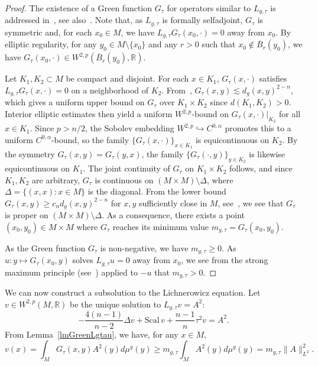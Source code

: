 \documentclass[a4paper, 10pt, reqno]{amsart}
\theoremstyle{plain}
\theoremstyle{remark}
\theoremstyle{definition}
\newcommand{\bR}{\mathbb{R}}
\newcommand{\Bbar}{\overline{B}}
\newcommand{\scal}{\mathrm{Scal}}
\begin{document}
\begin{proof}
    The existence of a Green function $G_\tau$ for operators similar to $L_{g,
                \tau}$ is addressed in~\cite{KimSakellaris}, see also~\cite{AvalosCogoAbrego}.
    Note that, as $L_{g, \tau}$ is formally selfadjoint, $G_\tau$ is symmetric and,
    for each $x_0 \in M$, we have $L_{g, \tau} G_\tau(x_0, \cdot) = 0$ away from
    $x_0$. By elliptic regularity, for any $y_0 \in M \setminus \{x_0\}$ and any $r
        > 0$ such that $x_0 \not\in \Bbar_r(y_0)$, we have $G_\tau(x_0, \cdot) \in
        W^{2, p}(\Bbar_r(y_0), \bR)$.

    Let $K_1, K_2 \subset M$ be compact and disjoint. For each $x \in K_1$,
    $G_\tau(x, \cdot)$ satisfies $L_{g, \tau} G_\tau(x, \cdot) = 0$ on a
    neighborhood of $K_2$. From~\cite[Theorem 6.12]{KimSakellaris}, $G_\tau(x, y)
        \lesssim d_g(x, y)^{2-n}$, which gives a uniform upper bound on $G_\tau$ over
    $K_1 \times K_2$ since $d(K_1, K_2) > 0$. Interior elliptic estimates then
    yield a uniform $W^{2, p}$-bound on $G_\tau(x, \cdot)|_{K_2}$ for all $x \in
        K_1$. Since $p > n/2$, the Sobolev embedding $W^{2, p} \hookrightarrow C^{0,
                \alpha}$ promotes this to a uniform $C^{0, \alpha}$-bound, so the family
    $\{G_\tau(x, \cdot)\}_{x \in K_1}$ is equicontinuous on $K_2$. By the symmetry
    $G_\tau(x, y) = G_\tau(y, x)$, the family $\{G_\tau(\cdot, y)\}_{y \in K_2}$ is
    likewise equicontinuous on $K_1$. The joint continuity of $G_\tau$ on $K_1
        \times K_2$ follows, and since $K_1, K_2$ are arbitrary, $G_\tau$ is continuous
    on $(M \times M) \setminus \Delta$, where $\Delta = \{(x, x) : x \in M\}$ is
    the diagonal. From the lower bound $G_\tau(x, y) \geq c_n d_g(x, y)^{2-n}$ for
    $x, y$ sufficiently close in $M$, see~\cite[Lemma 6.4]{Mourgoglou}, we see that
    $G_\tau$ is proper on $(M \times M)\setminus \Delta$. As a consequence, there
    exists a point $(x_0, y_0) \in M \times M$ where $G_\tau$ reaches its minimum
    value $m_{g, \tau} = G_\tau(x_0, y_0)$.

    As the Green function $G_\tau$ is non-negative, we have $m_{g, \tau} \geq 0$.
    As $u: y \mapsto G_\tau(x_0, y)$ solves $L_{g, \tau} u = 0$ away from $x_0$, we
    see from the strong maximum principle (see~\cite[Theorem
        8.19]{GilbargTrudinger}) applied to $-u$ that $m_{g, \tau} > 0$.
\end{proof}

We can now construct a subsolution to the Lichnerowicz equation. Let $v \in
    W^{2, p}(M, \bR)$ be the unique solution to $L_{g, \tau} v = A^2$:
\begin{equation}\label{eqSubsolution}
    -\frac{4(n-1)}{n-2} \Delta v + \scal\,v + \frac{n-1}{n} \tau^2 v = A^2.
\end{equation}
From Lemma~\ref{lmGreenLgtau}, we have, for any $x \in M$,
\begin{equation}\label{eqEstimateInfV}
    v(x) = \int_M G_\tau(x, y) A^2(y) d\mu^g(y) \geq m_{g, \tau} \int_M A^2(y) d\mu^g(y) = m_{g, \tau} \|A\|_{L^2}^2.
\end{equation}
\end{document}
